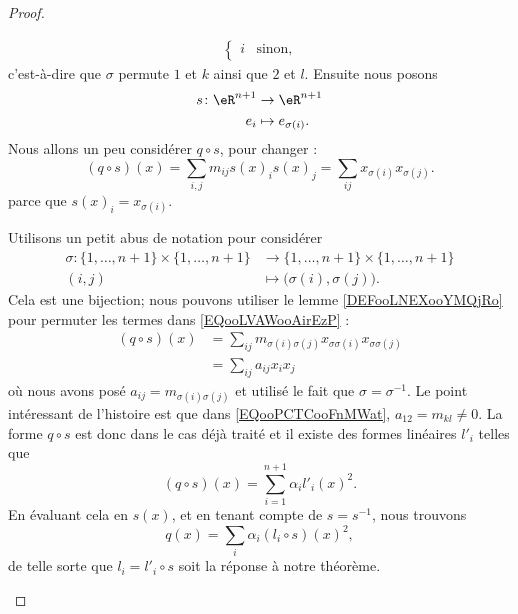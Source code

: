 \begin{proof}
\begin{subproof}
\begin{equation}
\begin{aligned}
\begin{cases}
					                                           i & \text{sinon,}
				                                           \end{cases}
			\end{aligned}
		\end{equation}
		c'est-à-dire que \( \sigma\) permute \( 1\) et \( k\) ainsi que \( 2\) et \( l\). Ensuite nous posons
		\begin{equation}
			\begin{aligned}
				s\colon \eR^{n+1} & \to \eR^{n+1}          \\
				e_i               & \mapsto e_{\sigma(i)}.
			\end{aligned}
		\end{equation}
		Nous allons un peu considérer \( q\circ s\), pour changer :
		\begin{equation}        \label{EQooLVAWooAirEzP}
			(q\circ s)(x)=\sum_{i,j}m_{ij}s(x)_is(x)_j=\sum_{ij}x_{\sigma(i)}x_{\sigma(j)}.
		\end{equation}
		parce que \( s(x)_i=x_{\sigma(i)}\).

		Utilisons un petit abus de notation pour considérer
		\begin{equation}
			\begin{aligned}
				\sigma\colon \{ 1,\ldots, n+1 \}\times \{ 1,\ldots, n+1 \} & \to \{ 1,\ldots, n+1 \}\times \{ 1,\ldots, n+1 \} \\
				(i,j)                                                      & \mapsto \big(\sigma(i), \sigma(j)\big).
			\end{aligned}
		\end{equation}
		Cela est une bijection; nous pouvons utiliser le lemme \ref{DEFooLNEXooYMQjRo} pour permuter les termes dans \eqref{EQooLVAWooAirEzP} :
		\begin{subequations}
			\begin{align}
				(q\circ s)(x) & =\sum_{ij}m_{\sigma(i)\sigma(j)}x_{\sigma\sigma(i)}x_{\sigma\sigma(j)} \\
				              & =\sum_{ij}a_{ij}x_ix_j     \label{EQooPCTCooFnMWat}
			\end{align}
		\end{subequations}
		où nous avons posé \( a_{ij}=m_{\sigma(i)\sigma(j)}\) et utilisé le fait que \( \sigma=\sigma^{-1}\). Le point intéressant de l'histoire est que dans \eqref{EQooPCTCooFnMWat}, \( a_{12}=m_{kl}\neq 0\). La forme \( q\circ s\) est donc dans le cas déjà traité et il existe des formes linéaires \( l'_i\) telles que
		\begin{equation}
			(q\circ s)(x)=\sum_{i=1}^{n+1}\alpha_il'_i(x)^2.
		\end{equation}
		En évaluant cela en \( s(x)\), et en tenant compte de \( s=s^{-1}\), nous trouvons
		\begin{equation}
			q(x)=\sum_i\alpha_i(l_i\circ s)(x)^2,
		\end{equation}
		de telle sorte que \( l_i=l'_i\circ s\) soit la réponse à notre théorème.
	\end{subproof}
\end{proof}


